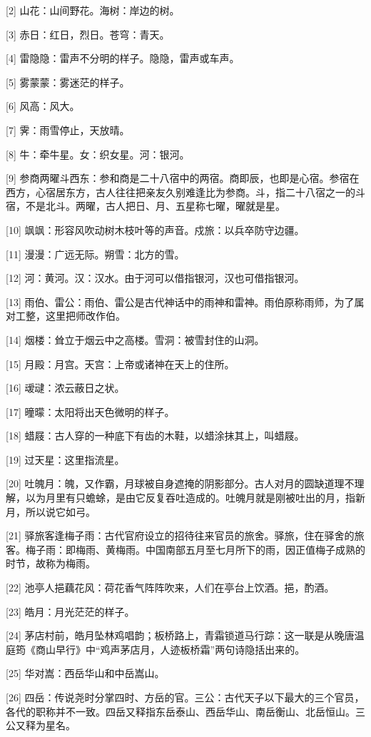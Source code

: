 \documentclass[12pt,UTF8]{ctexbook}
\begin{document}
[2] 山花：山间野花。海树：岸边的树。

[3] 赤日：红日，烈日。苍穹：青天。

[4] 雷隐隐：雷声不分明的样子。隐隐，雷声或车声。

[5] 雾蒙蒙：雾迷茫的样子。

[6] 风高：风大。

[7] 霁：雨雪停止，天放晴。

[8] 牛：牵牛星。女：织女星。河：银河。

[9] 参商两曜斗西东：参和商是二十八宿中的两宿。商即辰，也即是心宿。参宿在西方，心宿居东方，古人往往把亲友久别难逢比为参商。斗，指二十八宿之一的斗宿，不是北斗。两曜，古人把日、月、五星称七曜，曜就是星。

[10] 飒飒：形容风吹动树木枝叶等的声音。戍旅：以兵卒防守边疆。

[11] 漫漫：广远无际。朔雪：北方的雪。

[12] 河：黄河。汉：汉水。由于河可以借指银河，汉也可借指银河。

[13] 雨伯、雷公：雨伯、雷公是古代神话中的雨神和雷神。雨伯原称雨师，为了属对工整，这里把师改作伯。

[14] 烟楼：耸立于烟云中之高楼。雪洞：被雪封住的山洞。

[15] 月殿：月宫。天宫：上帝或诸神在天上的住所。

[16] 叆叇：浓云蔽日之状。

[17] 曈曚：太阳将出天色微明的样子。

[18] 蜡屐：古人穿的一种底下有齿的木鞋，以蜡涂抹其上，叫蜡屐。

[19] 过天星：这里指流星。

[20] 吐魄月：魄，又作霸，月球被自身遮掩的阴影部分。古人对月的圆缺道理不理解，以为月里有只蟾蜍，是由它反复吞吐造成的。吐魄月就是刚被吐出的月，指新月，所以说它如弓。

[21] 驿旅客逢梅子雨：古代官府设立的招待往来官员的旅舍。驿旅，住在驿舍的旅客。梅子雨：即梅雨、黄梅雨。中国南部五月至七月所下的雨，因正值梅子成熟的时节，故称为梅雨。

[22] 池亭人挹藕花风：荷花香气阵阵吹来，人们在亭台上饮酒。挹，酌酒。

[23] 皓月：月光茫茫的样子。

[24] 茅店村前，皓月坠林鸡唱韵；板桥路上，青霜锁道马行踪：这一联是从晚唐温庭筠《商山早行》中“鸡声茅店月，人迹板桥霜”两句诗隐括出来的。

[25] 华对嵩：西岳华山和中岳嵩山。

[26] 四岳：传说尧时分掌四时、方岳的官。三公：古代天子以下最大的三个官员，各代的职称并不一致。四岳又释指东岳泰山、西岳华山、南岳衡山、北岳恒山。三公又释为星名。
\end{document}
